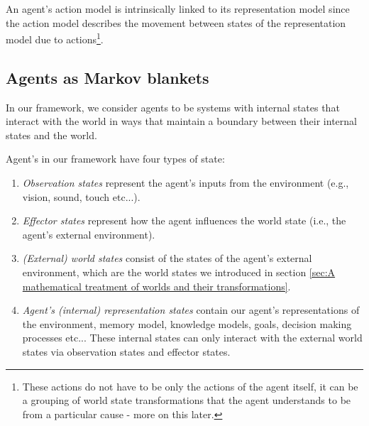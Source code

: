 An agent's action model is intrinsically linked to its representation model since the action model describes the movement between states of the representation model due to actions\footnote{These actions do not have to be only the actions of the agent itself, it can be a grouping of world state transformations that the agent understands to be from a particular cause - more on this later.}.



\subsection{Agents as Markov blankets}

In our framework, we consider agents to be systems with internal states that interact with the world in ways that maintain a boundary between their internal states and the world.

Agent's in our framework have four types of state:
\begin{enumerate}
    \item \emph{Observation states} represent the agent's inputs from the environment (e.g., vision, sound, touch etc...).
    \item \emph{Effector states} represent how the agent influences the world state (i.e., the agent's external environment).
    \item \emph{(External) world states} consist of the states of the agent's external environment, which are the world states we introduced in section \ref{sec:A mathematical treatment of worlds and their transformations}.
    \item \emph{Agent's (internal) representation states} contain our agent's representations of the environment, memory model, knowledge models, goals, decision making processes etc...
    These internal states can only interact with the external world states via observation states and effector states.
\end{enumerate}

